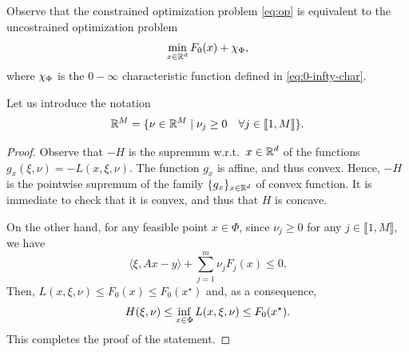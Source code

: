 Observe that the constrained optimization problem \eqref{eq:op} is equivalent to the uncostrained optimization problem
 \begin{equation}
     \min_{x\in \mathbb{R}^d} F_0(x) + \chi_{\operatorname{\Phi}},
 \end{equation}
 where $\chi_{\operatorname{\Phi}}$ is the $0-\infty$ characteristic function defined in \eqref{eq:0-infty-char}.
 
 Let us introduce the notation
 \begin{equation}
     \mathbb{R}^M=\{\nu\in \mathbb{R}^M\mid \nu_j\ge 0\quad \forall j\in \llbracket 1,M\rrbracket\}.
 \end{equation}
 
 
 
 \begin{proof}
     Observe that $-H$ is the supremum w.r.t.~$x\in \mathbb{R}^d$ of the functions $g_x(\xi,\nu) = -L(x,\xi,\nu)$. The function $g_x$ is affine, and thus convex. Hence, $-H$ is the pointwise supremum of the family $\{g_x\}_{x\in\mathbb{R}^d}$ of convex function. It is immediate to check that it is convex, and thus that $H$ is concave.
 
     On the other hand, for any feasible point $x\in \Phi$, since $\nu_j\ge 0$ for any $j\in \llbracket1,M\rrbracket$, we have
     \begin{equation}
         \langle \xi, Ax-y\rangle +\sum_{j=1}^m \nu_j F_j(x) \le 0.
     \end{equation}
     Then, $L(x,\xi,\nu)\le F_0(x)\le F_0(x^\star)$ and, as a consequence,
     \begin{equation}
         H(\xi,\nu) \le \inf_{x\in\operatorname{\Phi}} L(x,\xi,\nu) \le F_0(x^\star).
     \end{equation}
     This completes the proof of the statement.
 \end{proof}
 
